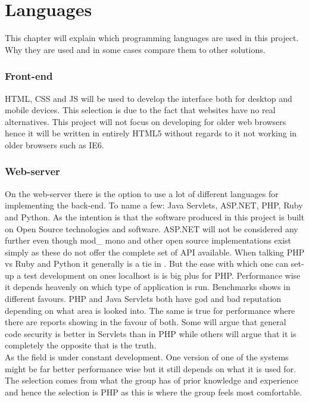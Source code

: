 \chapter{Languages}
\label{chp:languages}
This chapter will explain which programming languages are used in this project. Why they are used and in some cases compare them to other solutions.\\
\subsection*{Front-end}
\label{sec:frontend} %
HTML, CSS and JS will be used to develop the interface both for desktop and mobile devices. This selection is due to the fact that websites have no real alternatives. This project will not focus on developing for older web browsers hence it will be written in entirely HTML5 without regards to it not working in older browsers such as IE6.

\subsection*{Web-server}
\label{sec:webserver} %
On the web-server there is the option to use a lot of different languages for implementing the back-end. To name a few: Java Servlets, ASP.NET, PHP, Ruby and Python. As the intention is that the software produced in this project is built on Open Source technologies and software. ASP.NET will not be considered any further even though mod\_ mono and other open source implementations exist simply as these do not offer the complete set of API available. When talking PHP vs Ruby and Python it generally is a tie in . But the ease with which one can set-up a test development on ones localhost is is big plus for PHP. Performance wise it depends heavenly on which type of application is run. Benchmarks shows in different favours. PHP and Java Servlets both have god and bad reputation depending on what area is looked into. The same is true for performance where there are reports showing in the favour of both. Some will argue that general code security is better in Servlets than in PHP while others will argue that it is completely the opposite that is the truth. \\
As the field is under constant development. One version of one of the systems might be far better performance wise but it still depends on what it is used for. The selection comes from what the group has of prior knowledge and experience and hence the selection is PHP as this is where the group feels most comfortable.


